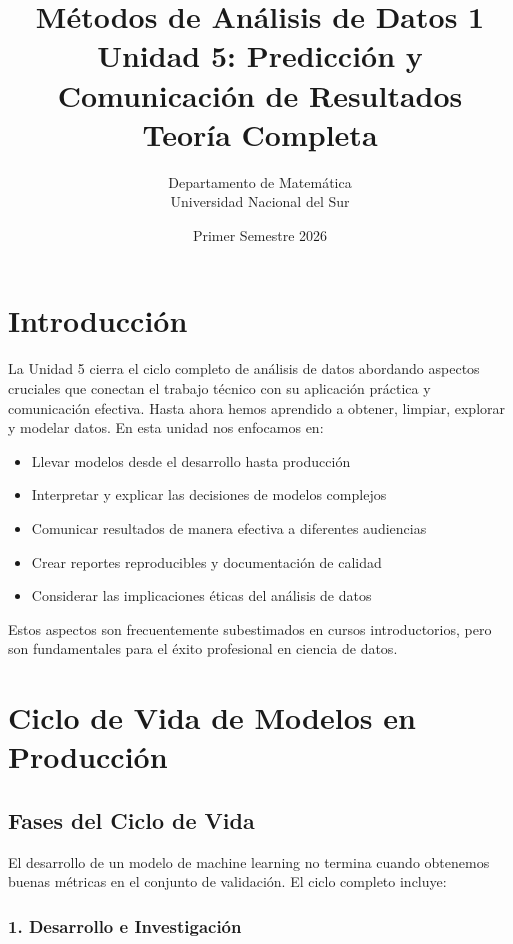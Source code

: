 \documentclass[11pt,a4paper]{article}
\title{\textbf{Métodos de Análisis de Datos 1}\\
\Large Unidad 5: Predicción y Comunicación de Resultados\\
\large Teoría Completa}
\author{Departamento de Matemática\\Universidad Nacional del Sur}
\date{Primer Semestre 2026}
\begin{document}
\maketitle

\tableofcontents
\newpage

\section{Introducción}

La Unidad 5 cierra el ciclo completo de análisis de datos abordando aspectos cruciales que conectan el trabajo técnico con su aplicación práctica y comunicación efectiva. Hasta ahora hemos aprendido a obtener, limpiar, explorar y modelar datos. En esta unidad nos enfocamos en:

\begin{itemize}
\item Llevar modelos desde el desarrollo hasta producción
\item Interpretar y explicar las decisiones de modelos complejos
\item Comunicar resultados de manera efectiva a diferentes audiencias
\item Crear reportes reproducibles y documentación de calidad
\item Considerar las implicaciones éticas del análisis de datos
\end{itemize}

Estos aspectos son frecuentemente subestimados en cursos introductorios, pero son fundamentales para el éxito profesional en ciencia de datos.

\section{Ciclo de Vida de Modelos en Producción}

\subsection{Fases del Ciclo de Vida}

El desarrollo de un modelo de machine learning no termina cuando obtenemos buenas métricas en el conjunto de validación. El ciclo completo incluye:

\subsubsection{1. Desarrollo e Investigación}
\end{document}
